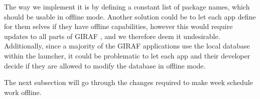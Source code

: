 The way we implement it  is by defining a constant list of package names, which should be usable in offline mode.
Another solution could be to let each app define for them selves if they have offline capabilities, however this would require updates to all parts of GIRAF , and we therefore deem it undesirable.
Additionally, since a majority of the GIRAF applications use the local database within the launcher, it could be problematic to let each app and their developer decide if they are allowed to modify the database in offline mode. 

The next subsection will go through the changes required to make week schedule work offline.

